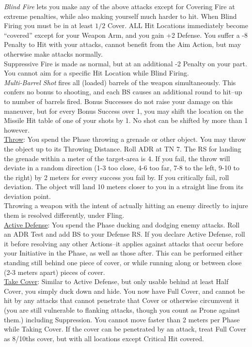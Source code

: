 \documentclass[a4paper, twocolumn, openany]{book}
\newlength{\indentlen}
\newcommand{\tabto}[1]{\setlength{\leftskip}{#1\indentlen}}
\begin{document}
{	{\slshape Blind Fire} lets you make any of the above attacks except for Covering Fire at extreme
	penalties, while also making yourself much harder to hit. When Blind Firing you must be
	in at least $1/2$ Cover. ALL Hit Locations immediately become “covered” except for your
	Weapon Arm, and you gain +2 Defense. You suffer a -8 Penalty to Hit with your attacks,
	cannot benefit from the Aim Action, but may otherwise make attacks normally.\\
	Suppressive Fire is made as normal, but at an additional -2 Penalty on your part. You
	cannot aim for a specific Hit Location while Blind Firing.\\

	{\slshape Multi-Barrel Shot} fires all (loaded) barrels of the weapon simultaneously. This confers no
	bonus to shooting, and each BS causes an additional round to hit--up to number of
	barrels fired. Bonus Successes do not raise your damage on this maneuver, but for
	every Bonus Success over 1, you may shift the location on the Missile Hit table of one of
	your shots by 1. No shot can be shifted by more than 1 however.\\

\tabto{0}
\underline{Throw}: You spend the Phase throwing a grenade or other object. You may throw the object up
to its Throwing Distance. Roll ADR at TN 7. The RS for landing the grenade within a meter of
the target-area is 4. If you fail, the throw will deviate in a random direction (1-3 too close, 4-6 too
far, 7-8 to the left, 9-10 to the right) by 2 meters for every success you fail by. If you critically fail,
roll deviation. The object will land 10 meters closer to you in a straight line from its deviation
point.\\
Throwing a weapon with the intent of actually hitting an enemy directly to injure them is resolved
differently, under Fling.\\

\underline{Active Defense}: You spend the Phase ducking and dodging enemy attacks. Roll an ADR Test
and add BS to your Defense RS. If you declare Active Defense, roll it before resolving any other
Actions--it applies against attacks that occur before your Initiative in the Phase, as well as those
after. This can be performed either standing still behind one piece of cover, or while running
along or between close (2-3 meters apart) pieces of cover.\\

\underline{Take Cover}: Similar to Active Defense, but only usable behind at least Half Cover, you simply
duck down and hide. You now have Full Cover, and cannot be hit by any attacks that cannot
penetrate that Cover or otherwise circumvent it (you are still vulnerable to flanking attacks,
though you count as Prone against them.) including Suppression. You cannot move faster than
2 meters per Phase while Taking Cover. If the cover can be penetrated by an attack, treat Full
Cover as 8/10ths cover, but with all locations except Critical Hit covered.\\

}
\end{document}
